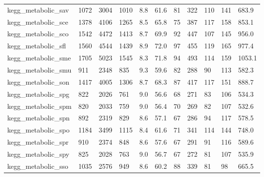 \begin{longtable}{lllllllllll}
 kegg\_metabolic\_sav                                 & 1072       & 3004      & 1010  & 8.8    & 61.6   & 81    & 322    & 110    & 141    & 683.9   \\
 kegg\_metabolic\_sce                                 & 1378       & 4106      & 1265  & 8.5    & 65.8   & 75    & 387    & 117    & 158    & 853.1   \\
 kegg\_metabolic\_sco                                 & 1542       & 4472      & 1413  & 8.7    & 69.9   & 92    & 447    & 107    & 145    & 956.0   \\
 kegg\_metabolic\_sfl                                 & 1560       & 4544      & 1439  & 8.9    & 72.0   & 97    & 455    & 119    & 165    & 977.4   \\
 kegg\_metabolic\_sme                                 & 1705       & 5023      & 1545  & 8.3    & 71.8   & 94    & 493    & 114    & 159    & 1053.1  \\
 kegg\_metabolic\_smu                                 & 911        & 2348      & 835   & 9.3    & 59.6   & 82    & 288    & 90     & 113    & 582.3   \\
 kegg\_metabolic\_son                                 & 1417       & 4005      & 1306  & 8.7    & 68.3   & 87    & 417    & 117    & 151    & 888.7   \\
 kegg\_metabolic\_spg                                 & 822        & 2026      & 761   & 9.0    & 56.6   & 68    & 271    & 83     & 106    & 534.3   \\
 kegg\_metabolic\_spm                                 & 820        & 2033      & 759   & 9.0    & 56.4   & 70    & 269    & 82     & 107    & 532.6   \\
 kegg\_metabolic\_spn                                 & 892        & 2319      & 829   & 8.6    & 57.1   & 67    & 286    & 94     & 117    & 578.5   \\
 kegg\_metabolic\_spo                                 & 1184       & 3499      & 1115  & 8.4    & 61.6   & 71    & 341    & 114    & 144    & 748.0   \\
 kegg\_metabolic\_spr                                 & 910        & 2374      & 848   & 8.6    & 57.6   & 67    & 291    & 91     & 116    & 589.6   \\
 kegg\_metabolic\_spy                                 & 825        & 2028      & 763   & 9.0    & 56.7   & 67    & 272    & 81     & 107    & 535.9   \\
 kegg\_metabolic\_sso                                 & 1035       & 2576      & 949   & 8.6    & 60.2   & 88    & 339    & 81     & 98     & 665.5   \\

\end{longtable}
